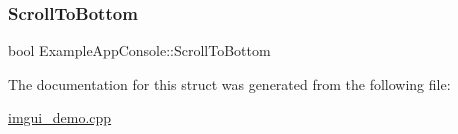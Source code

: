 \mbox{\label{struct_example_app_console_a69b1406795fd71a3757761b0767ea1c5}} 
\subsubsection{\texorpdfstring{Scroll\+To\+Bottom}{ScrollToBottom}}
{\footnotesize\ttfamily bool Example\+App\+Console\+::\+Scroll\+To\+Bottom}



The documentation for this struct was generated from the following file\+:\begin{DoxyCompactItemize}
\item 
\mbox{\hyperlink{imgui__demo_8cpp}{imgui\+\_\+demo.\+cpp}}\end{DoxyCompactItemize}
